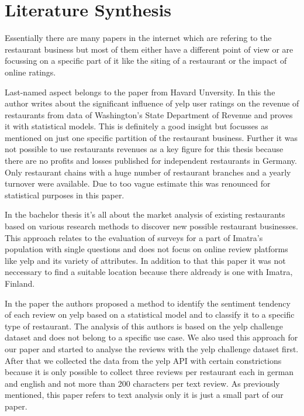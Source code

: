 \section{Literature Synthesis}
\label{sec:synthesis}
Essentially there are many papers in the internet which are refering to the restaurant business but most of them either have a different point of view or are focussing on a specific part of it like the siting of a restaurant or the impact of online ratings.

Last-named aspect belongs to the paper from Havard Unversity\cite{CaseOfYelp}. In this the author writes about the significant influence of yelp user ratings on the revenue of restaurants from data of Washington’s State Department of Revenue and proves it with statistical models. This is definitely a good insight but focusses as mentioned on just one specific partition of the restaurant business. Further it was not possible to use restaurants revenues as a key figure for this thesis because there are no profits and losses published for independent restaurants in Germany. Only restaurant chains with a huge number of restaurant branches and a yearly turnover were available. Due to too vague estimate this was renounced for statistical purposes in this paper.

In the bachelor thesis \cite{Imatra} it's all about the market analysis of existing restaurants based on various research methods to discover new possible restaurant businesses. This approach relates to the evaluation of surveys for a part of Imatra's population with single questions and does not focus on online review platforms like yelp and its variety of attributes. In addition to that this paper it was not neccessary to find a suitable location because there aldready is one with Imatra, Finland.

In the paper \cite{SentimentAnalysis} the authors proposed a method to identify the sentiment tendency of each review on yelp based on a statistical model and to classify it to a specific type of restaurant. The analysis of this authors is based on the yelp challenge dataset and does not belong to a specific use case. We also used this approach for our paper and started to analyse the reviews with the yelp challenge dataset first. After that we collected the data from the yelp API with certain constrictions because it is only possible to collect three reviews per restaurant each in german and english and not more than 200 characters per text review. As previously mentioned, this paper refers to text analysis only it is just a small part of our paper.  



